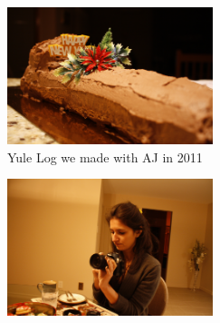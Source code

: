 \begin{figure}
  \includegraphics[width=60mm]{dermardiros/images/Logcake.JPG}
    \caption{Yule Log we made with AJ in 2011}
\end{figure}
\begin{figure}
  \includegraphics[width=60mm]{dermardiros/images/Logcake 3.JPG}    
\end{figure}
